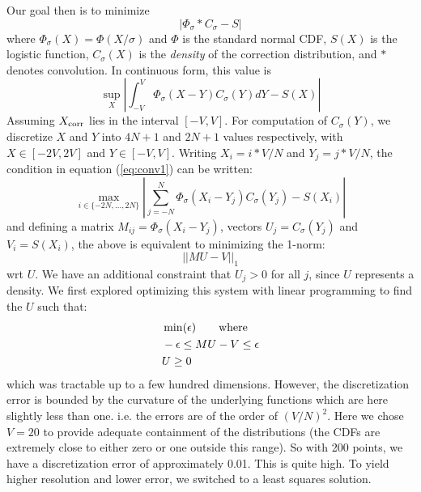 \documentclass{article}
\begin{document}
Our goal then is to minimize
\begin{equation}
  |\Phi_{\sigma} * C_{\sigma} - S|
\end{equation}
where $\Phi_{\sigma}(X) = \Phi(X/\sigma)$ and $\Phi$ is the standard
normal CDF, $S(X)$ is the logistic function, $C_{\sigma}(X)$ is the
{\em density} of the correction distribution, and $*$ denotes
convolution. In continuous form, this value is
\begin{equation}
  \label{eq:conv1}
  \sup_X\left|\int_{-V}^{V}\Phi_{\sigma}(X-Y) C_{\sigma}(Y) dY - S(X)\right|
  \end{equation}
Assuming $X_{\rm corr}$ lies in the interval $[-V,V]$. For computation of $C_{\sigma}(Y)$, we
discretize $X$ and $Y$ into $4N+1$ and $2N+1$ values respectively, with $X \in [-2V,2V]$ and
$Y \in [-V,V]$. Writing $X_i = i * V / N$ and $Y_j = j * V / N$, the condition in
equation (\ref{eq:conv1}) can be written:
\begin{equation}
  \max_{i \in \{-2N,\ldots,2N\}}\left|\sum_{j = -N}^{N}\Phi_{\sigma}(X_i-Y_j) C_{\sigma}(Y_j) - S(X_i)\right|
\end{equation}
and defining a matrix $M_{ij} = \Phi_{\sigma}(X_i-Y_j)$, vectors $U_j = C_{\sigma}(Y_j)$ and $V_i = S(X_i)$, the
above is equivalent to minimizing the 1-norm:
\begin{equation}
  \label{eq:error_norm}
  ||MU-V||_1
\end{equation}
wrt $U$. We have an additional constraint that $U_j > 0$ for all $j$, since $U$ represents
a density. We first explored optimizing this system with linear programming to find the $U$ such that:
\begin{equation}
  \begin{split}
    & \min(\epsilon) \qquad \hbox{where} \\
    & -\epsilon \leq MU - V \leq \epsilon \\
    & U \geq 0
  \end{split}
\end{equation}
which was tractable up to a few hundred dimensions. However, the discretization error is bounded by
the curvature of the underlying functions which are here slightly less than one. i.e.
the errors are of the order of $(V/N)^2$. Here we chose $V=20$ to provide adequate containment of
the distributions (the CDFs are extremely close to either zero or one outside this range). So
with 200 points, we have a discretization error of approximately 0.01. This is quite high. To yield
higher resolution and lower error, we switched to a least squares solution. 
\end{document}

